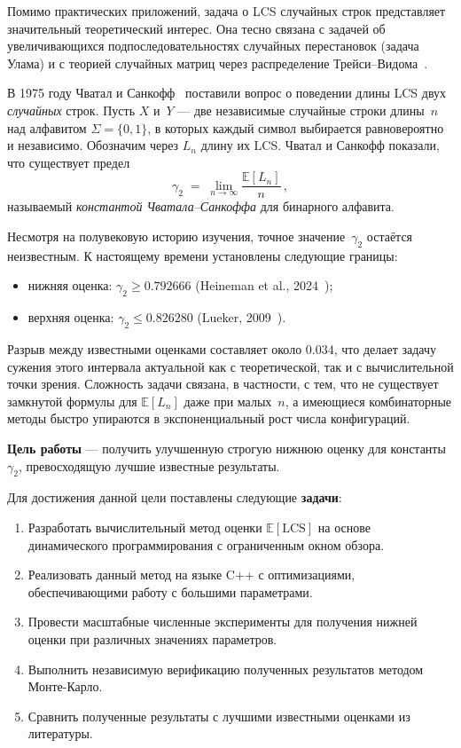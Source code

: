 \documentclass[12pt,a4paper]{article}
\begin{document}
Помимо практических приложений, задача о LCS случайных строк представляет значительный теоретический интерес.
Она тесно связана с задачей об увеличивающихся подпоследовательностях случайных перестановок (задача Улама) и с теорией случайных матриц через распределение Трейси--Видома~\cite{steele1986}.

В 1975 году Чватал и Санкофф~\cite{chvatal1975} поставили вопрос о поведении длины LCS двух \emph{случайных} строк.
Пусть $X$ и~$Y$ --- две независимые случайные строки длины~$n$ над алфавитом $\Sigma = \{0,1\}$, в которых каждый символ выбирается равновероятно и независимо.
Обозначим через $L_n$ длину их LCS.
Чватал и Санкофф показали, что существует предел
\[
  \gamma_2 \;=\; \lim_{n \to \infty} \frac{\mathbb{E}[L_n]}{n}\,,
\]
называемый \emph{константой Чватала--Санкоффа} для бинарного алфавита.

Несмотря на полувековую историю изучения, точное значение~$\gamma_2$ остаётся неизвестным.
К настоящему времени установлены следующие границы:
\begin{itemize}
  \item нижняя оценка: $\gamma_2 \geq 0.792666$ (Heineman et al., 2024~\cite{heineman2024});
  \item верхняя оценка: $\gamma_2 \leq 0.826280$ (Lueker, 2009~\cite{lueker2009}).
\end{itemize}
Разрыв между известными оценками составляет около $0.034$, что делает задачу сужения этого интервала актуальной как с теоретической, так и с вычислительной точки зрения.
Сложность задачи связана, в частности, с тем, что не существует замкнутой формулы для $\mathbb{E}[L_n]$ даже при малых~$n$, а имеющиеся комбинаторные методы быстро упираются в экспоненциальный рост числа конфигураций.

\textbf{Цель работы} --- получить улучшенную строгую нижнюю оценку для константы~$\gamma_2$, превосходящую лучшие известные результаты.

Для достижения данной цели поставлены следующие \textbf{задачи}:
\begin{enumerate}
  \item Разработать вычислительный метод оценки $\mathbb{E}[\mathrm{LCS}]$ на основе динамического программирования с ограниченным окном обзора.
  \item Реализовать данный метод на языке C++ с оптимизациями, обеспечивающими работу с большими параметрами.
  \item Провести масштабные численные эксперименты для получения нижней оценки при различных значениях параметров.
  \item Выполнить независимую верификацию полученных результатов методом Монте-Карло.
  \item Сравнить полученные результаты с лучшими известными оценками из литературы.
\end{enumerate}
\end{document}
